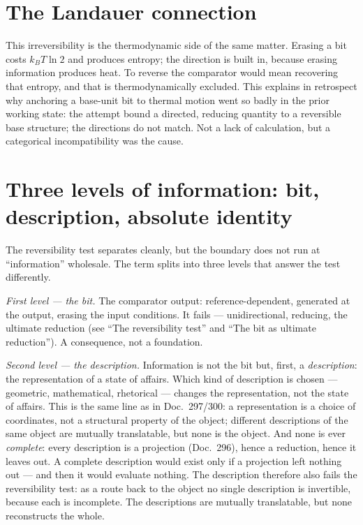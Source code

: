 \section{The Landauer connection}

This irreversibility is the thermodynamic side of the same matter. Erasing a bit
costs $k_B T \ln 2$ and produces entropy; the direction is built in, because
erasing information produces heat. To reverse the comparator would mean
recovering that entropy, and that is thermodynamically excluded. This explains in
retrospect why anchoring a base-unit bit to thermal motion went so badly in the
prior working state: the attempt bound a directed, reducing quantity to a
reversible base structure; the directions do not match. Not a lack of
calculation, but a categorical incompatibility was the cause.

\section{Three levels of information: bit, description, absolute identity}

The reversibility test separates cleanly, but the boundary does not run at
\enquote{information} wholesale. The term splits into three levels that answer
the test differently.

\emph{First level --- the bit.} The comparator output: reference-dependent,
generated at the output, erasing the input conditions. It fails ---
unidirectional, reducing, the ultimate reduction (see \enquote{The reversibility
test} and \enquote{The bit as ultimate reduction}). A consequence, not a
foundation.

\emph{Second level --- the description.} Information is not the bit but, first,
a \emph{description}: the representation of a state of affairs. Which kind of
description is chosen --- geometric, mathematical, rhetorical --- changes the
representation, not the state of affairs. This is the same line as in
Doc.~297/300: a representation is a choice of coordinates, not a structural
property of the object; different descriptions of the same object are mutually
translatable, but none is the object. And none is ever \emph{complete}: every
description is a projection (Doc.~296), hence a reduction, hence it leaves out. A
complete description would exist only if a projection left nothing out --- and
then it would evaluate nothing. The description therefore also fails the
reversibility test: as a route back to the object no single description is
invertible, because each is incomplete. The descriptions are mutually
translatable, but none reconstructs the whole.

